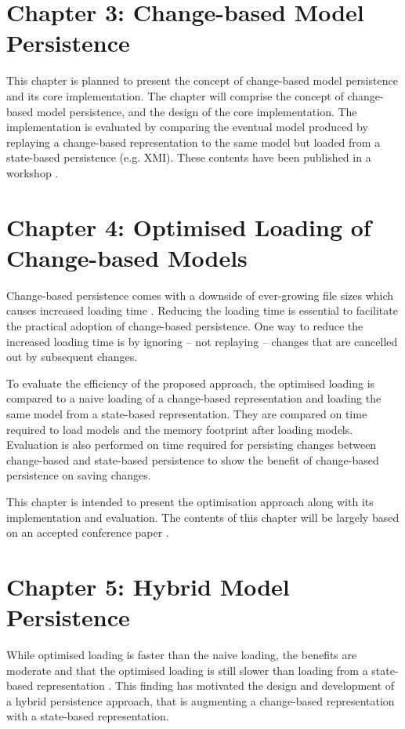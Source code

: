 \documentclass[12pt, a4paper]{report} \usepackage[titletoc]{appendix}
\begin{document}
\section{Chapter 3: Change-based Model Persistence}
\label{sec:chapter_3_Change-based_model_ersistence_plan}
This chapter is planned to present the concept of change-based model persistence and its core implementation. The chapter will comprise the concept of change-based model persistence, and the design of the core implementation. The implementation is evaluated by comparing the eventual model produced by replaying a change-based representation to the same model but loaded from a state-based persistence (e.g. XMI). These contents have been published in a workshop \cite{DBLP:conf/models/YohannisKP17}.


\section{Chapter 4: Optimised Loading of Change-based Models}
\label{sec:chapter_4_optimised_loading_change_based_model_persistence}

Change-based persistence comes with a downside of ever-growing file sizes \cite{DBLP:journals/entcs/RobbesL07,DBLP:conf/edoc/KoegelHLHD10} which causes increased loading time \cite{mens2002state}. Reducing the loading time is essential to facilitate the practical adoption of change-based persistence. One way to reduce the increased loading time is by ignoring -- not replaying -- changes that are cancelled out by subsequent changes. 

To evaluate the efficiency of the proposed approach, the optimised loading is compared to a naive loading of a change-based representation and loading the same model from a state-based representation. They are compared on time required to load models and the memory footprint after loading models. Evaluation is also performed on time required for persisting changes between change-based and state-based persistence to show the benefit of change-based persistence on saving changes. 

This chapter is intended to present the optimisation approach along with its implementation and evaluation. The contents of this chapter will be largely based on an accepted conference paper \cite{yohannis2018towards}. 


\section{Chapter 5: Hybrid Model Persistence}
\label{sec:chapter_5_hybrid_model_persistence}
While optimised loading is faster than the naive loading, the benefits are moderate and that the optimised loading is still slower than loading from a state-based representation \cite{yohannis2018towards}. This finding has motivated the design and development of a hybrid persistence approach, that is augmenting a change-based representation with a state-based representation. 
\end{document}
